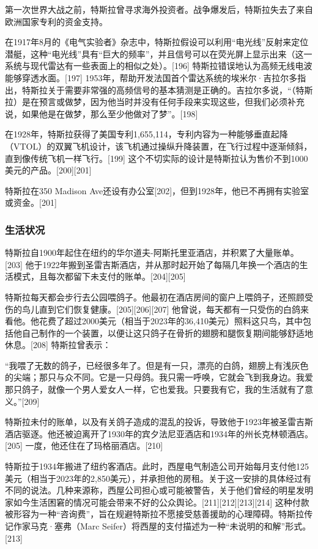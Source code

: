 第一次世界大战之前，特斯拉曾寻求海外投资者。战争爆发后，特斯拉失去了来自欧洲国家专利的资金支持。

在1917年8月的《电气实验者》杂志中，特斯拉假设可以利用“电光线”反射来定位潜艇，这种“电光线”具有“巨大的频率”，并且信号可以在荧光屏上显示出来（这一系统与现代雷达有一些表面上的相似之处）。[196] 特斯拉错误地认为高频无线电波能够穿透水面。[197] 1953年，帮助开发法国首个雷达系统的埃米尔·吉拉尔多指出，特斯拉关于需要非常强的高频信号的基本猜测是正确的。吉拉尔多说，“（特斯拉）是在预言或做梦，因为他当时并没有任何手段来实现这些，但我们必须补充说，如果他是在做梦，那么至少他做对了梦”。[198]

在1928年，特斯拉获得了美国专利1,655,114，专利内容为一种能够垂直起降（VTOL）的双翼飞机设计，该飞机通过操纵升降装置，在飞行过程中逐渐倾斜，直到像传统飞机一样飞行。[199] 这个不切实际的设计是特斯拉认为售价不到1000美元的产品。[200][201]

特斯拉在350 Madison Ave还设有办公室[202]，但到1928年，他已不再拥有实验室或资金。[201]
\subsubsection{生活状况}  
特斯拉自1900年起住在纽约的华尔道夫-阿斯托里亚酒店，并积累了大量账单。[203] 他于1922年搬到圣雷吉斯酒店，并从那时起开始了每隔几年换一个酒店的生活模式，且每次都留下未支付的账单。[204][205]  

特斯拉每天都会步行去公园喂鸽子。他最初在酒店房间的窗户上喂鸽子，还照顾受伤的鸟儿直到它们恢复健康。[205][206][207] 他曾说，每天都有一只受伤的白鸽来看他。他花费了超过2000美元（相当于2023年的36,410美元）照料这只鸟，其中包括他自己制作的一个装置，以便让这只鸽子在骨折的翅膀和腿恢复期间能够舒适地休息。[208] 特斯拉曾表示：

“我喂了无数的鸽子，已经很多年了。但是有一只，漂亮的白鸽，翅膀上有浅灰色的尖端；那只与众不同。它是一只母鸽。我只需一呼唤，它就会飞到我身边。我爱那只鸽子，就像一个男人爱女人一样，它也爱我。只要我有它，我的生活就有了意义。”[209]

特斯拉未付的账单，以及有关鸽子造成的混乱的投诉，导致他于1923年被圣雷吉斯酒店驱逐。他还被迫离开了1930年的宾夕法尼亚酒店和1934年的州长克林顿酒店。[205] 一度，他还住在了玛格丽酒店。[210]

特斯拉于1934年搬进了纽约客酒店。此时，西屋电气制造公司开始每月支付他125美元（相当于2023年的2,850美元），并承担他的房租。关于这一安排的具体经过有不同的说法。几种来源称，西屋公司担心或可能被警告，关于他们曾经的明星发明家如今生活困窘的情况可能会带来不好的公众舆论。[211][212][213][214] 这种付款被形容为一种“咨询费”，旨在规避特斯拉不愿接受慈善援助的心理障碍。特斯拉传记作家马克·塞弗（Marc Seifer）将西屋的支付描述为一种“未说明的和解”形式。[213]
